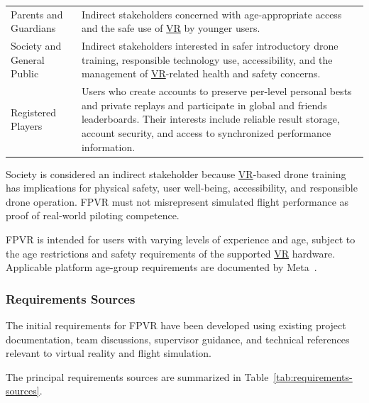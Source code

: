 \documentclass[12pt]{article}
\begin{document}
\begin{table}[htbp]
\begin{tabularx}{\textwidth}{@{}p{3.4cm} X@{}}
\addlinespace

Parents and Guardians &
Indirect stakeholders concerned with age-appropriate
access and the safe use of \hyperlink{glos:VR}{VR} by younger users. \\

\addlinespace

Society and General Public &
Indirect stakeholders interested in safer introductory
drone training, responsible technology use,
accessibility, and the management of \hyperlink{glos:VR}{VR}-related
health and safety concerns. \\


\addlinespace

Registered Players &
Users who create accounts to preserve per-level personal bests and private
replays and participate in global and friends leaderboards. Their
interests include reliable result storage,
account security, and access to synchronized
performance information. \\


\bottomrule
\end{tabularx}
\end{table}

Society is considered an indirect stakeholder because
\hyperlink{glos:VR}{VR}-based drone training has implications for physical
safety, user well-being, accessibility, and responsible
drone operation. FPVR must not misrepresent simulated
flight performance as proof of real-world piloting
competence.

FPVR is intended for users with varying levels of
experience and age, subject to the age restrictions
and safety requirements of the supported \hyperlink{glos:VR}{VR} hardware.
Applicable platform age-group requirements are
documented by Meta~\cite{metaAgeGroups}.


\subsubsection{Requirements Sources}

The initial requirements for FPVR have been developed
using existing project documentation, team discussions,
supervisor guidance, and technical references relevant
to virtual reality and flight simulation.

The principal requirements sources are summarized
in Table~\ref{tab:requirements-sources}.
\end{document}
